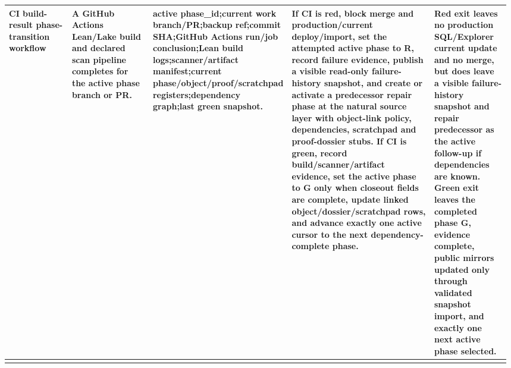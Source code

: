 \begin{longtable}{L{0.14\linewidth} L{0.19\linewidth} L{0.18\linewidth} L{0.31\linewidth} L{0.16\linewidth}}
CI build-result phase-transition workflow & A GitHub Actions Lean/\allowbreak{}Lake build and declared scan pipeline completes for the active phase branch or PR. & active phase\_id;\newline current work branch/\allowbreak{}PR;\newline backup ref;\newline commit SHA;\newline GitHub Actions run/\allowbreak{}job conclusion;\newline Lean build logs;\newline scanner/\allowbreak{}artifact manifest;\newline current phase/\allowbreak{}object/\allowbreak{}proof/\allowbreak{}scratchpad registers;\newline dependency graph;\newline last green snapshot. & If CI is red, block merge and production/\allowbreak{}current deploy/\allowbreak{}import, set the attempted active phase to R, record failure evidence, publish a visible read-only failure-history snapshot, and create or activate a predecessor repair phase at the natural source layer with object-link policy, dependencies, scratchpad and proof-dossier stubs. If CI is green, record build/\allowbreak{}scanner/\allowbreak{}artifact evidence, set the active phase to G only when closeout fields are complete, update linked object/\allowbreak{}dossier/\allowbreak{}scratchpad rows, and advance exactly one active cursor to the next dependency-complete phase. & Red exit leaves no production SQL/\allowbreak{}Explorer current update and no merge, but does leave a visible failure-history snapshot and repair predecessor as the active follow-up if dependencies are known. Green exit leaves the completed phase G, evidence complete, public mirrors updated only through validated snapshot import, and exactly one next active phase selected.\\
\hline
\addlinespace[0.24em]

\end{longtable}
